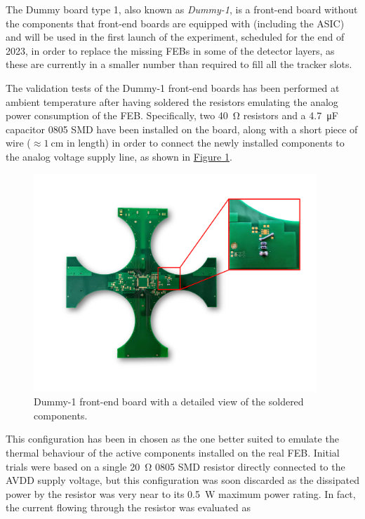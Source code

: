 The Dummy board type 1, also known as \textit{Dummy-1}, is a front-end board without the components that front-end boards are equipped with (including the ASIC) and will be used in the first launch of the experiment, scheduled for the end of 2023, in order to replace the missing FEBs in some of the detector layers, as these are currently in a smaller number than required to fill all the tracker slots.

The validation tests of the Dummy-1 front-end boards has been performed at ambient temperature after having soldered the resistors emulating the analog power consumption of the FEB. Specifically, two \SI{40}{\ohm} resistors and a \SI{4.7}{\micro\farad} capacitor 0805 SMD have been installed on the board, along with a short piece of wire ($\approx\SI{1}{\cm}$ in length) in order to connect the newly installed components to the analog voltage supply line, as shown in \hyperref[figDummySoldering]{Figure \ref{figDummySoldering}}. 

\begin{figure}[h!]
    \centering
    \includegraphics[width=0.95\textwidth]{Images/chap2/dummy_image.pdf}
    \caption{Dummy-1 front-end board with a detailed view of the soldered components.}
    \label{figDummySoldering}
\end{figure}

This configuration has been in chosen as the one better suited to emulate the thermal behaviour of the active components installed on the real FEB. Initial trials were based on a single \SI{20}{\ohm} 0805 SMD resistor directly connected to the AVDD supply voltage, but this configuration was soon discarded as the dissipated power by the resistor was very near to its \SI{0.5}{\watt} maximum power rating. In fact, the current flowing through the resistor was evaluated as

